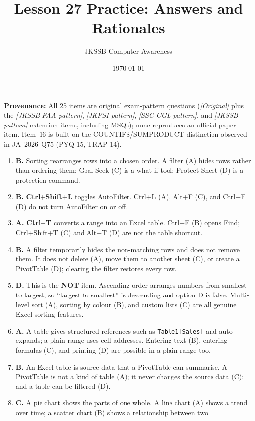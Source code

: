 \documentclass[11pt]{article}
\title{Lesson 27 Practice: Answers and Rationales}
\author{JKSSB Computer Awareness}
\date{\today}
\begin{document}
\maketitle
\noindent\textbf{Provenance:} All 25 items are original exam-pattern questions (\textit{[Original]} plus the \textit{[JKSSB FAA-pattern]}, \textit{[JKPSI-pattern]}, \textit{[SSC CGL-pattern]}, and \textit{[JKSSB-pattern]} extension items, including MSQs); none reproduces an official paper item. Item~16
is built on the COUNTIFS/SUMPRODUCT distinction observed in JA~2026~Q75
(PYQ-15, TRAP-14).
\begin{enumerate}[label=\textbf{Q\arabic*.}, leftmargin=*]
\item \textbf{B.} Sorting rearranges rows into a chosen order. A filter (A)
  hides rows rather than ordering them; Goal Seek (C) is a what-if tool;
  Protect Sheet (D) is a protection command.
\item \textbf{B.} \textbf{Ctrl}$+$\textbf{Shift}$+$\textbf{L} toggles
  AutoFilter. Ctrl+L (A), Alt+F (C), and Ctrl+F (D) do not turn AutoFilter on
  or off.
\item \textbf{A.} \textbf{Ctrl}$+$\textbf{T} converts a range into an Excel
  table. Ctrl+F (B) opens Find; Ctrl+Shift+T (C) and Alt+T (D) are not the
  table shortcut.
\item \textbf{B.} A filter temporarily hides the non-matching rows and does not
  remove them. It does not delete (A), move them to another sheet (C), or
  create a PivotTable (D); clearing the filter restores every row.
\item \textbf{D.} This is the \textbf{NOT} item. Ascending order arranges
  numbers from smallest to largest, so ``largest to smallest'' is descending and
  option D is false. Multi-level sort (A), sorting by colour (B), and custom
  lists (C) are all genuine Excel sorting features.
\item \textbf{A.} A table gives structured references such as
  \texttt{Table1[Sales]} and auto-expands; a plain range uses cell addresses.
  Entering text (B), entering formulas (C), and printing (D) are possible in a
  plain range too.
\item \textbf{B.} An Excel table is source data that a PivotTable can
  summarise. A PivotTable is not a kind of table (A); it never changes the
  source data (C); and a table can be filtered (D).
\item \textbf{C.} A pie chart shows the parts of one whole. A line chart (A)
  shows a trend over time; a scatter chart (B) shows a relationship between two

\end{enumerate}
\end{document}

